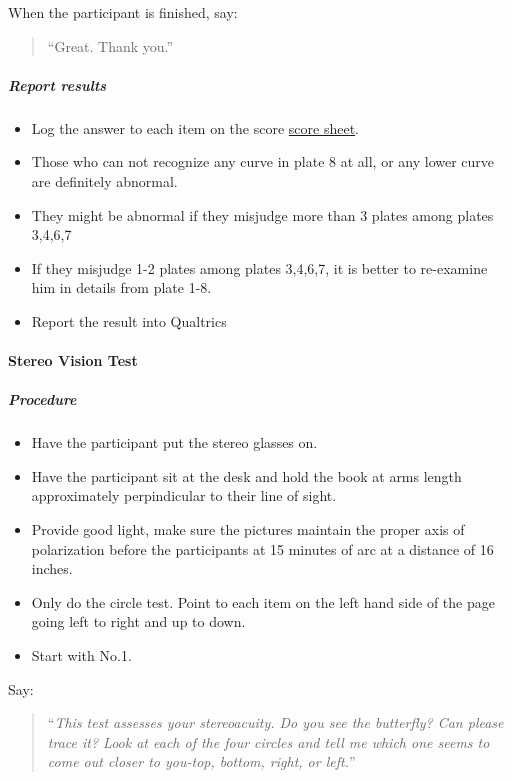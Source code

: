 \documentclass[]{article}
\providecommand{\tightlist}{%
  \setlength{\itemsep}{0pt}\setlength{\parskip}{0pt}}
\let\oldparagraph\paragraph
\renewcommand{\paragraph}[1]{\oldparagraph{#1}\mbox{}}
\let\oldsubparagraph\subparagraph
\renewcommand{\subparagraph}[1]{\oldsubparagraph{#1}\mbox{}}
\begin{document}
When the participant is finished, say:

\begin{quote}
``Great. Thank you.''
\end{quote}

\hypertarget{report-results-1}{%
\subparagraph{Report results}\label{report-results-1}}

\begin{itemize}
\tightlist
\item
  Log the answer to each item on the score
  \href{vision-screening-score-sheet.html}{score sheet}.
\item
  Those who can not recognize any curve in plate 8 at all, or any lower
  curve are definitely abnormal.
\item
  They might be abnormal if they misjudge more than 3 plates among
  plates 3,4,6,7
\item
  If they misjudge 1-2 plates among plates 3,4,6,7, it is better to
  re-examine him in details from plate 1-8.
\item
  Report the result into Qualtrics
\end{itemize}

\hypertarget{stereo-vision-test}{%
\paragraph{Stereo Vision Test}\label{stereo-vision-test}}

\hypertarget{procedure-2}{%
\subparagraph{Procedure}\label{procedure-2}}

\begin{itemize}
\tightlist
\item
  Have the participant put the stereo glasses on.
\item
  Have the participant sit at the desk and hold the book at arms length
  approximately perpindicular to their line of sight.
\item
  Provide good light, make sure the pictures maintain the proper axis of
  polarization before the participants at 15 minutes of arc at a
  distance of 16 inches.
\item
  Only do the circle test. Point to each item on the left hand side of
  the page going left to right and up to down.
\item
  Start with No.1.
\end{itemize}

Say:

\begin{quote}
``\emph{This test assesses your stereoacuity. Do you see the butterfly?
Can please trace it? Look at each of the four circles and tell me which
one seems to come out closer to you-top, bottom, right, or left.}''
\end{quote}
\end{document}
